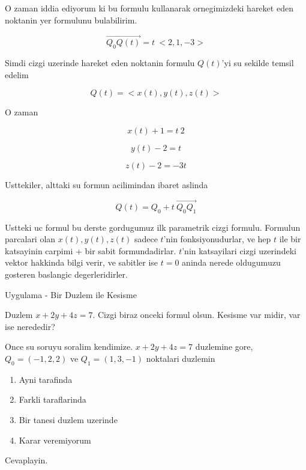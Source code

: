\documentclass[12pt,fleqn]{article}
\begin{document}
O zaman iddia ediyorum ki bu formulu kullanarak ornegimizdeki hareket eden
noktanin yer formulunu bulabilirim.

\[ \vec{Q_0Q(t)} = t \ <2,1,-3>  \]

Simdi cizgi uzerinde hareket eden noktanin formulu $Q(t)$'yi su sekilde
temsil edelim

\[ Q(t) = <x(t),y(t),z(t)> \]

O zaman

\[ x(t) + 1 = t \ 2 \]

\[ y(t) - 2 = t \]

\[ z(t) - 2 = -3t \]

Usttekiler, alttaki su formun acilimindan ibaret aslinda

\[ Q(t) = Q_0 + t \ \vec{Q_0Q_1}  \]

Ustteki uc formul bu derste gordugumuz ilk parametrik cizgi
formulu. Formulun parcalari olan $x(t),y(t),z(t)$ sadece $t$'nin
fonksiyonudurlar, ve hep $t$ ile bir katsayinin carpimi + bir sabit
formundadirlar. $t$'nin katsayilari cizgi uzerindeki vektor hakkinda bilgi
verir, ve sabitler ise $t=0$ aninda nerede oldugumuzu gosteren baslangic
degerleridirler. 

Uygulama - Bir Duzlem ile Kesisme

Duzlem $x+2y+4z=7$. Cizgi biraz onceki formul olsun. Kesisme var midir, var
ise nerededir? 

Once su soruyu soralim kendimize. $x+2y+4z=7$ duzlemine gore, 
$Q_0 =
(-1,2,2)$ ve $Q_1 = (1,3,-1)$ noktalari duzlemin

\begin{enumerate}
   \item Ayni tarafinda
   \item Farkli taraflarinda
   \item Bir tanesi duzlem uzerinde
   \item Karar veremiyorum
\end{enumerate}

Cevaplayin. 
\end{document}
